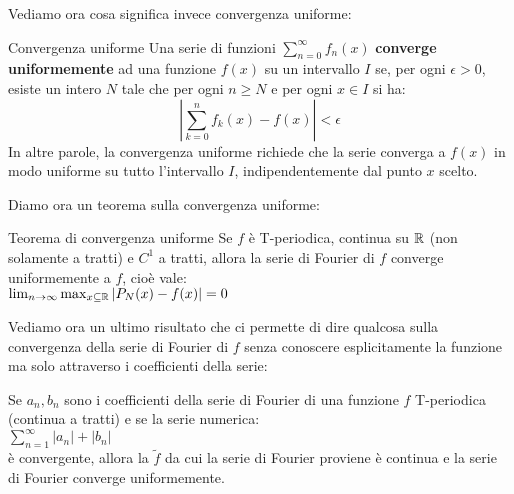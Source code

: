 Vediamo ora cosa significa invece convergenza uniforme:
\begin{definizione}{Convergenza uniforme}
  Una serie di funzioni $\sum_{n=0}^{\infty} f_n(x)$ \textbf{converge uniformemente} ad una funzione $f(x)$ su un intervallo $I$ se, per ogni $\epsilon > 0$, esiste un intero $N$ tale che per ogni $n \geq N$ e per ogni $x \in I$ si ha:
  $$
  \left| \sum_{k=0}^{n} f_k(x) - f(x) \right| < \epsilon
  $$
  In altre parole, la convergenza uniforme richiede che la serie converga a $f(x)$ in modo uniforme su tutto l'intervallo $I$, indipendentemente dal punto $x$ scelto.
\end{definizione}

Diamo ora un teorema sulla convergenza uniforme:
\begin{teorema}{Teorema di convergenza uniforme}
  Se $f$ è T-periodica, continua su $\mathbb{R}$ (non solamente a tratti) e $C^1$ a tratti, allora la serie di Fourier di $f$ converge uniformemente a $f$, cioè vale:\\
  $ \lim_{n \to \infty} \max_{x \subseteq \mathbb{R}} |P_N(x)-f(x)|=0$
\end{teorema}

Vediamo ora un ultimo risultato che ci permette di dire qualcosa sulla convergenza della serie di Fourier di $f$ senza conoscere esplicitamente la funzione ma solo attraverso i coefficienti della serie:
\begin{teorema}{}
  Se ${a_n,b_n}$ sono i coefficienti della serie di Fourier di una funzione $f$ T-periodica (continua a tratti) e se la serie numerica:\\
  $\sum_{n=1}^{\infty} |a_n|+|b_n|$\\
  è convergente, allora la $\tilde{f}$ da cui la serie di Fourier proviene è continua e la serie di Fourier converge uniformemente.
\end{teorema}
